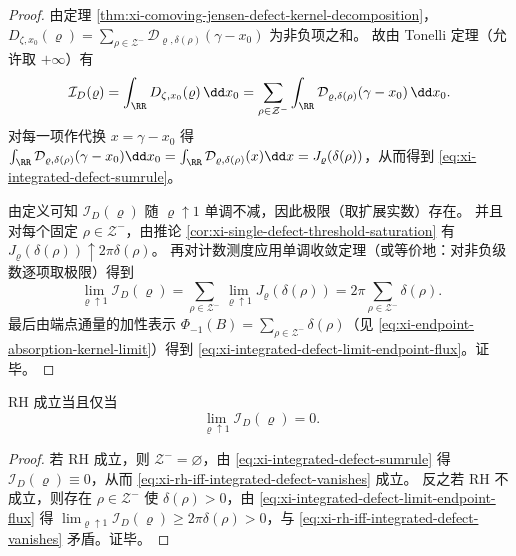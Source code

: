 \begin{proof}
 由定理 \ref{thm:xi-comoving-jensen-defect-kernel-decomposition}，
 \(
 D_{\zeta,x_0}(\varrho)=\sum_{\rho\in\mathcal{Z}^-}\mathcal{D}_{\varrho,\delta(\rho)}(\gamma-x_0)
 \)
 为非负项之和。
故由 Tonelli 定理（允许取 \(+\infty\)）有
 \[
 \mathcal{I}_D(\varrho)
 =\int_{\RR}D_{\zeta,x_0}(\varrho)\,\dd x_0
 =\sum_{\rho\in\mathcal{Z}^-}\int_{\RR}\mathcal{D}_{\varrho,\delta(\rho)}(\gamma-x_0)\,\dd x_0.
 \]
 对每一项作代换 \(x=\gamma-x_0\) 得
 \(
 \int_{\RR}\mathcal{D}_{\varrho,\delta(\rho)}(\gamma-x_0)\dd x_0
 =\int_{\RR}\mathcal{D}_{\varrho,\delta(\rho)}(x)\dd x
 =J_{\varrho}(\delta(\rho))
 \)，从而得到 \eqref{eq:xi-integrated-defect-sumrule}。
 \par
 由定义可知 \(\mathcal{I}_D(\varrho)\) 随 \(\varrho\uparrow 1\) 单调不减，因此极限（取扩展实数）存在。
并且对每个固定 \(\rho\in\mathcal{Z}^-\)，由推论 \ref{cor:xi-single-defect-threshold-saturation} 有
 \(
 J_{\varrho}(\delta(\rho))\uparrow 2\pi\delta(\rho)
 \)。
再对计数测度应用单调收敛定理（或等价地：对非负级数逐项取极限）得到
 \[
 \lim_{\varrho\uparrow 1}\mathcal{I}_D(\varrho)
 =\sum_{\rho\in\mathcal{Z}^-}\lim_{\varrho\uparrow 1}J_{\varrho}(\delta(\rho))
 =2\pi\sum_{\rho\in\mathcal{Z}^-}\delta(\rho).
 \]
 最后由端点通量的加性表示 \(\Phi_{-1}(B)=\sum_{\rho\in\mathcal{Z}^-}\delta(\rho)\)（见 \eqref{eq:xi-endpoint-absorption-kernel-limit}）得到 \eqref{eq:xi-integrated-defect-limit-endpoint-flux}。证毕。
\end{proof}

\begin{corollary}\label{cor:xi-scalar-certificate-integrated-defect}
RH 成立当且仅当
\begin{equation}\label{eq:xi-rh-iff-integrated-defect-vanishes}
\boxed{\;\lim_{\varrho\uparrow 1}\mathcal{I}_D(\varrho)=0.\;}
\end{equation}
\end{corollary}

\begin{proof}
若 RH 成立，则 \(\mathcal{Z}^-=\varnothing\)，由 \eqref{eq:xi-integrated-defect-sumrule} 得 \(\mathcal{I}_D(\varrho)\equiv 0\)，从而 \eqref{eq:xi-rh-iff-integrated-defect-vanishes} 成立。
反之若 RH 不成立，则存在 \(\rho\in\mathcal{Z}^-\) 使 \(\delta(\rho)>0\)，由 \eqref{eq:xi-integrated-defect-limit-endpoint-flux} 得
\(
\lim_{\varrho\uparrow 1}\mathcal{I}_D(\varrho)\ge 2\pi\delta(\rho)>0
\)，与 \eqref{eq:xi-rh-iff-integrated-defect-vanishes} 矛盾。证毕。
\end{proof}

